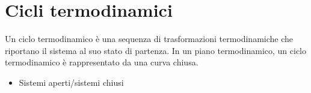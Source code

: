 \documentclass[letterpaper,10pt,italian]{jupyterBook}
\begin{document}
\section{Cicli termodinamici}
\label{\detokenize{ch/thermodynamics/heat-engine-td-cycles:cicli-termodinamici}}\label{\detokenize{ch/thermodynamics/heat-engine-td-cycles:physics-hs-thermodynamics-heat-engine-td-cycles}}\label{\detokenize{ch/thermodynamics/heat-engine-td-cycles::doc}}
\sphinxAtStartPar
Un ciclo termodinamico è una sequenza di trasformazioni termodinamiche che riportano il sistema al suo stato di partenza.
In un piano termodinamico, un ciclo termodinamico è rappresentato da una curva chiusa.
\begin{itemize}
\item {} 
\sphinxAtStartPar
{} Sistemi aperti/sistemi chiusi

\end{itemize}
\end{document}

